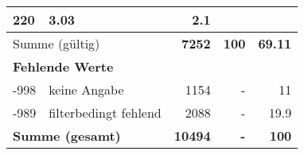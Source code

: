 \begin{longtable}{lXrrr}
       \num{220} &
       \num[round-mode=places,round-precision=2]{3.03} &
         \num[round-mode=places,round-precision=2]{2.1} \\
     \midrule
     \multicolumn{2}{l}{Summe (gültig)} &
       \textbf{\num{7252}} &
     \textbf{\num{100}} &
       \textbf{\num[round-mode=places,round-precision=2]{69.11}} \\
     \multicolumn{5}{l}{\textbf{Fehlende Werte}}\\
       -998 &
       keine Angabe &
         \num{1154} &
        - &
         \num[round-mode=places,round-precision=2]{11} \\
       -989 &
       filterbedingt fehlend &
         \num{2088} &
        - &
         \num[round-mode=places,round-precision=2]{19.9} \\
     \midrule
     \multicolumn{2}{l}{\textbf{Summe (gesamt)}} &
          \textbf{\num{10494}} &
        \textbf{-} &
        \textbf{\num{100}} \\
     \bottomrule
     \end{longtable}
     
